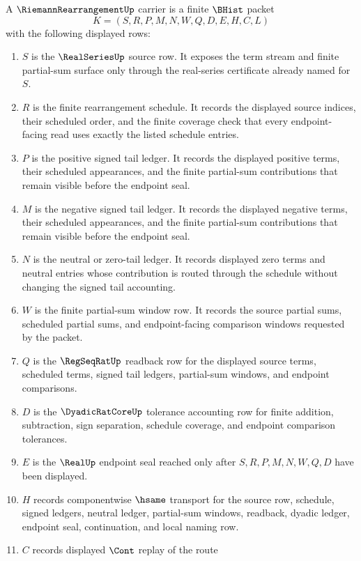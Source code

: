 \begin{definition}\label{def:riemann-rearrangement-carrier}
A $\RiemannRearrangementUp$ carrier is a finite $\BHist$ packet
$$
K=(S,R,P,M,N,W,Q,D,E,H,C,L)
$$
with the following displayed rows:
\begin{enumerate}
\item $S$ is the $\RealSeriesUp$ source row. It exposes the term stream and finite partial-sum surface only through the real-series certificate already named for $S$.
\item $R$ is the finite rearrangement schedule. It records the displayed source indices, their scheduled order, and the finite coverage check that every endpoint-facing read uses exactly the listed schedule entries.
\item $P$ is the positive signed tail ledger. It records the displayed positive terms, their scheduled appearances, and the finite partial-sum contributions that remain visible before the endpoint seal.
\item $M$ is the negative signed tail ledger. It records the displayed negative terms, their scheduled appearances, and the finite partial-sum contributions that remain visible before the endpoint seal.
\item $N$ is the neutral or zero-tail ledger. It records displayed zero terms and neutral entries whose contribution is routed through the schedule without changing the signed tail accounting.
\item $W$ is the finite partial-sum window row. It records the source partial sums, scheduled partial sums, and endpoint-facing comparison windows requested by the packet.
\item $Q$ is the $\RegSeqRatUp$ readback row for the displayed source terms, scheduled terms, signed tail ledgers, partial-sum windows, and endpoint comparisons.
\item $D$ is the $\DyadicRatCoreUp$ tolerance accounting row for finite addition, subtraction, sign separation, schedule coverage, and endpoint comparison tolerances.
\item $E$ is the $\RealUp$ endpoint seal reached only after $S,R,P,M,N,W,Q,D$ have been displayed.
\item $H$ records componentwise $\hsame$ transport for the source row, schedule, signed ledgers, neutral ledger, partial-sum windows, readback, dyadic ledger, endpoint seal, continuation, and local naming row.
\item $C$ records displayed $\Cont$ replay of the route

\end{enumerate}
\end{definition}
